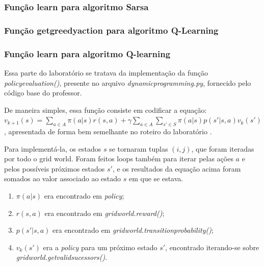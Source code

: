 \documentclass[conference]{IEEEtran}
\begin{document}
\subsubsection{Função learn para algoritmo Sarsa}

\subsubsection{Função get\underline{\space}greedy\underline{\space}action para algoritmo Q-Learning}

\subsubsection{Função learn para algoritmo Q-learning}

Essa parte do laboratório se tratava da implementação da função \textit{policy\underline{\space}evaluation()}, presente no arquivo \textit{dynamic\underline{\space}programming.py}, fornecido pelo código base do professor. 

De maneira simples, essa função consiste em codificar a equação: $v_{k+1}\left ( s \right ) = \sum_{a\in A} \pi \left ( a|s \right ) r \left ( s, a \right ) + \gamma \sum_{a\in A} \sum_{s'\in S} \pi \left ( a|s \right ) p \left ( s' | s, a \right ) v_k \left ( s' \right )$, apresentada de forma bem semelhante no roteiro do laboratório \cite{roteiro}.

Para implementá-la, os estados $s$ se tornaram tuplas $(i, j)$, que foram iteradas por todo o grid world. Foram feitos loops também para iterar pelas ações $a$ e pelos possíveis próximos estados $s'$, e os resultados da equação acima foram somados ao valor associado ao estado $s$ em que se estava. 

\begin{enumerate}
\item $\pi \left ( a|s \right )$ era encontrado em \textit{policy};

\item $r \left ( s, a \right )$ era encontrado em \textit{grid\underline{\space}world.reward()};

\item $p \left ( s' | s, a \right )$ era encontrado em \textit{grid\underline{\space}world.transition\underline{\space}probability()};

\item $v_k \left ( s' \right )$ era a \textit{policy} para um próximo estado $s'$, encontrado iterando-se sobre \textit{grid\underline{\space}world.get\underline{\space}valid\underline{\space}sucessors()}.
\end{enumerate}
\end{document}
